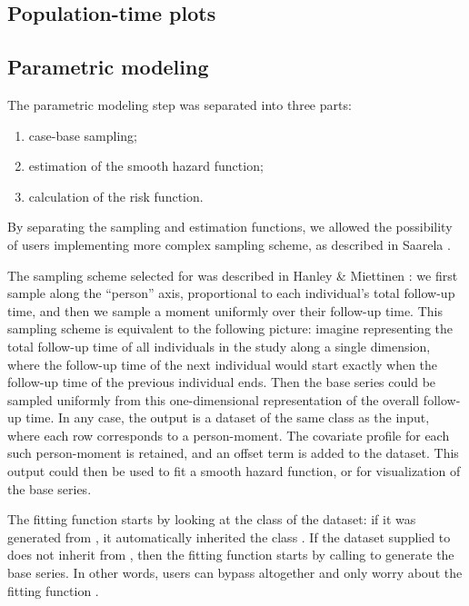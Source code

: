 \documentclass[
]{jss}
\providecommand{\tightlist}{%
  \setlength{\itemsep}{0pt}\setlength{\parskip}{0pt}}
\begin{document}
\hypertarget{population-time-plots}{%
\subsection{Population-time plots}\label{population-time-plots}}

\hypertarget{parametric-modeling}{%
\subsection{Parametric modeling}\label{parametric-modeling}}

The parametric modeling step was separated into three parts:

\begin{enumerate}
\def\labelenumi{\arabic{enumi}.}
\tightlist
\item
  case-base sampling;
\item
  estimation of the smooth hazard function;
\item
  calculation of the risk function.
\end{enumerate}

By separating the sampling and estimation functions, we allowed the
possibility of users implementing more complex sampling scheme, as
described in Saarela \citeyearpar{saarela2016case}.

The sampling scheme selected for  was described in
Hanley \& Miettinen \citeyearpar{hanley2009fitting}: we first sample
along the ``person'' axis, proportional to each individual's total
follow-up time, and then we sample a moment uniformly over their
follow-up time. This sampling scheme is equivalent to the following
picture: imagine representing the total follow-up time of all
individuals in the study along a single dimension, where the follow-up
time of the next individual would start exactly when the follow-up time
of the previous individual ends. Then the base series could be sampled
uniformly from this one-dimensional representation of the overall
follow-up time. In any case, the output is a dataset of the same class
as the input, where each row corresponds to a person-moment. The
covariate profile for each such person-moment is retained, and an offset
term is added to the dataset. This output could then be used to fit a
smooth hazard function, or for visualization of the base series.

The fitting function  starts by looking at the
class of the dataset: if it was generated from , it
automatically inherited the class . If the dataset supplied
to  does not inherit from , then the
fitting function starts by calling  to generate the
base series. In other words, users can bypass 
altogether and only worry about the fitting function
.
\end{document}
